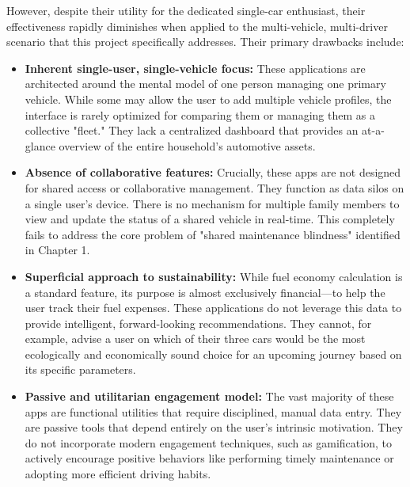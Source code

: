 \textgap

However, despite their utility for the dedicated single-car enthusiast, their effectiveness rapidly diminishes when applied to the multi-vehicle, multi-driver scenario that this project specifically addresses. Their primary drawbacks include:

\begin{itemize}
    \item \textbf{Inherent single-user, single-vehicle focus:} These applications are architected around the mental model of one person managing one primary vehicle. While some may allow the user to add multiple vehicle profiles, the interface is rarely optimized for comparing them or managing them as a collective "fleet." They lack a centralized dashboard that provides an at-a-glance overview of the entire household's automotive assets.
    
    \textgap
    
    \item \textbf{Absence of collaborative features:} Crucially, these apps are not designed for shared access or collaborative management. They function as data silos on a single user's device. There is no mechanism for multiple family members to view and update the status of a shared vehicle in real-time. This completely fails to address the core problem of "shared maintenance blindness" identified in Chapter 1.
    
    \textgap
    
    \item \textbf{Superficial approach to sustainability:} While fuel economy calculation is a standard feature, its purpose is almost exclusively financial—to help the user track their fuel expenses. These applications do not leverage this data to provide intelligent, forward-looking recommendations. They cannot, for example, advise a user on which of their three cars would be the most ecologically and economically sound choice for an upcoming journey based on its specific parameters.
    
    \textgap
    
    \item \textbf{Passive and utilitarian engagement model:} The vast majority of these apps are functional utilities that require disciplined, manual data entry. They are passive tools that depend entirely on the user's intrinsic motivation. They do not incorporate modern engagement techniques, such as gamification, to actively encourage positive behaviors like performing timely maintenance or adopting more efficient driving habits.
\end{itemize}

